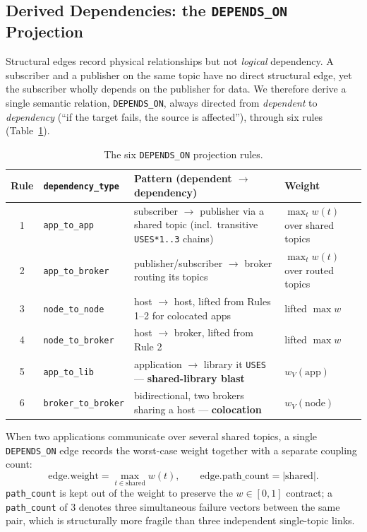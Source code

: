 \documentclass[review]{elsarticle}
\begin{document}
\subsection{Derived Dependencies: the \texttt{DEPENDS\_ON} Projection}

Structural edges record physical relationships but not \emph{logical} dependency. A subscriber and a
publisher on the same topic have no direct structural edge, yet the subscriber wholly depends on the
publisher for data. We therefore derive a single semantic relation, \texttt{DEPENDS\_ON}, always
directed from \emph{dependent} to \emph{dependency} (``if the target fails, the source is
affected''), through six rules (Table~\ref{tab:rules}).

\begin{table}[h]
\centering
\caption{The six \texttt{DEPENDS\_ON} projection rules.}
\label{tab:rules}
\begin{tabular}{@{}cp{2.3cm}p{5.2cm}p{3cm}@{}}
\toprule
Rule & \texttt{dependency\_type} & Pattern (dependent $\to$ dependency) & Weight \\
\midrule
1 & \texttt{app\_to\_app} & subscriber $\to$ publisher via a shared topic (incl.\ transitive \texttt{USES*1..3} chains) & $\max_t w(t)$ over shared topics \\
2 & \texttt{app\_to\_broker} & publisher/subscriber $\to$ broker routing its topics & $\max_t w(t)$ over routed topics \\
3 & \texttt{node\_to\_node} & host $\to$ host, lifted from Rules 1--2 for colocated apps & lifted $\max w$ \\
4 & \texttt{node\_to\_broker} & host $\to$ broker, lifted from Rule 2 & lifted $\max w$ \\
5 & \texttt{app\_to\_lib} & application $\to$ library it \texttt{USES} --- \textbf{shared-library blast} & $w_V(\text{app})$ \\
6 & \texttt{broker\_to\_broker} & bidirectional, two brokers sharing a host --- \textbf{colocation} & $w_V(\text{node})$ \\
\bottomrule
\end{tabular}
\end{table}

When two applications communicate over several shared topics, a single \texttt{DEPENDS\_ON} edge
records the worst-case weight together with a separate coupling count:
\begin{equation}
\text{edge.weight} = \max_{t \in \text{shared}} w(t), \qquad \text{edge.path\_count} = |\text{shared}|.
\end{equation}
\texttt{path\_count} is kept out of the weight to preserve the $w \in [0,1]$ contract; a
\texttt{path\_count} of 3 denotes three simultaneous failure vectors between the same pair, which is
structurally more fragile than three independent single-topic links.
\end{document}
